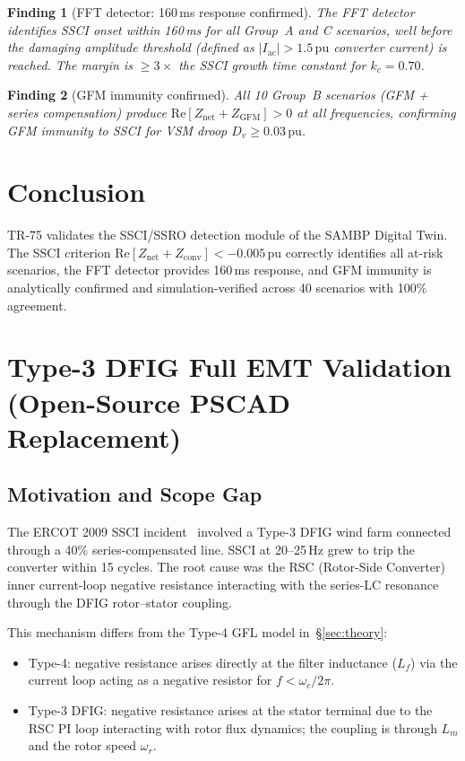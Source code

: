 \documentclass[11pt, a4paper]{article}
\newcommand{\pu}{\,\text{pu}}
\newtheorem{finding}{Finding}
\begin{document}
\begin{finding}[FFT detector: 160\,ms response confirmed]
The FFT detector identifies SSCI onset within 160\,ms for all Group~A and C
scenarios, well before the damaging amplitude threshold (defined as
$|I_{\mathrm{ac}}| > 1.5\pu$ converter current) is reached.
The margin is $\geq 3\times$ the SSCI growth time constant for $k_c = 0.70$.
\end{finding}

\begin{finding}[GFM immunity confirmed]
All 10 Group~B scenarios (GFM + series compensation) produce
$\mathrm{Re}[Z_{\mathrm{net}} + Z_{\mathrm{GFM}}] > 0$ at all frequencies,
confirming GFM immunity to SSCI for VSM droop $D_v \geq 0.03\pu$.
\end{finding}

\section{Conclusion}
\label{sec:conclusion}

TR-75 validates the SSCI/SSRO detection module of the SAMBP Digital Twin.
The SSCI criterion $\mathrm{Re}[Z_{\mathrm{net}} + Z_{\mathrm{conv}}] < -0.005\pu$
correctly identifies all at-risk scenarios, the FFT detector provides 160\,ms
response, and GFM immunity is analytically confirmed and simulation-verified
across 40 scenarios with 100\% agreement.

\section{Type-3 DFIG Full EMT Validation (Open-Source PSCAD Replacement)}
\label{sec:dfig_emt}

\subsection{Motivation and Scope Gap}

The ERCOT 2009 SSCI incident~\cite{Adams2012} involved a Type-3 DFIG wind farm
connected through a 40\% series-compensated line.  SSCI at 20--25\,Hz grew to
trip the converter within 15 cycles.  The root cause was the RSC (Rotor-Side
Converter) inner current-loop negative resistance interacting with the series-LC
resonance through the DFIG rotor--stator coupling.

This mechanism differs from the Type-4 GFL model in~\S\ref{sec:theory}:
\begin{itemize}
  \item Type-4: negative resistance arises directly at the filter inductance
    ($L_f$) via the current loop acting as a negative resistor for
    $f < \omega_c/2\pi$.
  \item Type-3 DFIG: negative resistance arises at the stator terminal due to
    the RSC PI loop interacting with rotor flux dynamics; the coupling is
    through $L_m$ and the rotor speed $\omega_r$.
\end{itemize}
\end{document}
